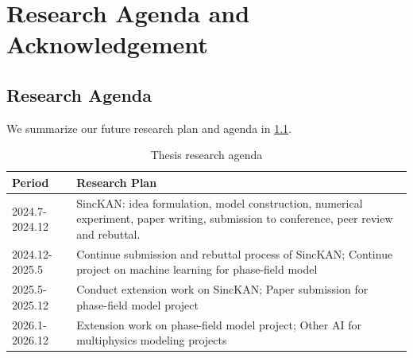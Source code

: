 \def\baselinestretch{1}
\chapter{Research Agenda and Acknowledgement}
\ifpdf
    \graphicspath{{Conclusions/ConclusionsFigs/PNG/}{Conclusions/ConclusionsFigs/PDF/}{Conclusions/ConclusionsFigs/}}
\else
    \graphicspath{{Conclusions/ConclusionsFigs/EPS/}{Conclusions/ConclusionsFigs/}}
\fi

\def\baselinestretch{1.66}

\section{Research Agenda}
We summarize our future research plan and agenda in \cref{tab:agenda}.
\begin{table}[H]
    \centering
    \begin{tabular}{|l|p{8cm}|}
        \hline
        Period & Research Plan \\
        \hline
        2024.7-2024.12 & SincKAN: idea formulation, model construction, numerical experiment, paper writing, submission to conference, peer review and rebuttal. \\
        \hline
        2024.12-2025.5 & Continue submission and rebuttal process of SincKAN; Continue project on machine learning for phase-field model \\
        \hline
        2025.5-2025.12 & Conduct extension work on SincKAN; Paper submission for phase-field model project \\
        \hline
        2026.1-2026.12 & Extension work on phase-field model project; Other AI for multiphysics modeling projects \\
        \hline
    \end{tabular}
    \caption{Thesis research agenda}
    \label{tab:agenda}
\end{table}
